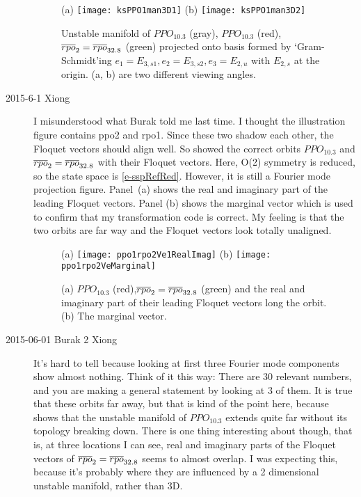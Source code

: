 \begin{description}
\begin{figure}[ht]
\begin{center}
    (a) \texttt{[image: ksPPO1man3D1]}
    (b) \texttt{[image: ksPPO1man3D2]}
\end{center}
    \caption[]{
       Unstable manifold of $PPO_{10.3}$ (gray), $PPO_{10.3}$ (red),
       $\overline{rpo}_{2}=\overline{rpo}_{32.8}$ (green) projected onto basis formed by
       `Gram-Schmidt'ing
       $e_1 = E_{3, s1}, e_2 = E_{3, s2}, e_3 = E_{2, u}$ with
       $E_{2, s}$ at the origin. (a, b) are two different viewing
       angles.
    }
    \label{f-ksPPO1man3D}
\end{figure}

\item[2015-6-1 Xiong]
I misunderstood what Burak told me last time. I thought the illustration
figure contains ppo2 and rpo1. Since these two shadow each other, the
Floquet vectors should align well. So  showed the
correct orbits $PPO_{10.3}$ and $\overline{rpo}_{2}=\overline{rpo}_{32.8}$ with their Floquet vectors.
Here, O(2) symmetry
is reduced, so the state space is \eqref{e-sspRefRed}. However, it
is still a Fourier mode projection figure. Panel~(a) shows the real
and imaginary part of the leading Floquet vectors. Panel (b) shows
the marginal vector which is used to confirm that my transformation
code is correct. My feeling is that the two orbits are far way and
the Floquet vectors look totally unaligned.
\begin{figure}[ht]
\begin{center}
    (a) \texttt{[image: ppo1rpo2Ve1RealImag]}
    (b) \texttt{[image: ppo1rpo2VeMarginal]}
\end{center}
    \caption[]{
      (a) $PPO_{10.3}$ (red),$\overline{rpo}_{2}=\overline{rpo}_{32.8}$ (green) and the real
      and imaginary part of their leading Floquet vectors long
      the orbit.
      (b) The marginal vector.
    }
    \label{f-ksppo1rpo2}
\end{figure}

\item[2015-06-01 Burak 2 Xiong] It's hard to tell because looking at
first three Fourier mode components show almost nothing. Think of it
this way: There are 30 relevant numbers, and you are making a general
statement by looking at 3 of them. It is true that these orbits far
away, but that is kind of the point here, because
 shows that the unstable manifold of
$PPO_{10.3}$ extends quite far without its topology
 breaking down. There is one thing
interesting about  though, that is, at three
locations I can see, real and imaginary parts of the Floquet vectors
of $\overline{rpo}_{2}=\overline{rpo}_{32.8}$ seems to almost overlap. I was expecting this, because
it's probably where they are influenced by a 2 dimensional unstable
manifold, rather than 3D.


\end{description}
